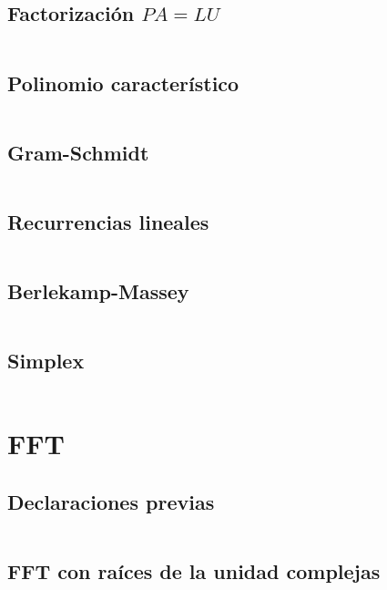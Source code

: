\documentclass[11pt]{article}
\begin{document}
		\subsection{Factorización $PA=LU$}
		\inputminted[tabsize=2,breaklines,firstline=269,lastline=285,fontsize=\small]{c++}{matrix.cpp}
		
		\subsection{Polinomio característico}
		\inputminted[tabsize=2,breaklines,firstline=287,lastline=297,fontsize=\small]{c++}{matrix.cpp}
		
		\subsection{Gram-Schmidt}
		\inputminted[tabsize=2,breaklines,firstline=299,lastline=315,fontsize=\small]{c++}{matrix.cpp}
		
		\subsection{Recurrencias lineales}
		\inputminted[tabsize=2,breaklines,firstline=7,lastline=33,fontsize=\small]{c++}{recurrence.cpp}
		
		\subsection{Berlekamp-Massey}
		\inputminted[tabsize=2,breaklines,firstline=46,lastline=81,fontsize=\small]{c++}{recurrence.cpp}
		
		\subsection{Simplex}
		\inputminted[tabsize=2,breaklines,fontsize=\small]{c++}{simplex.cpp}
		
		
	\newpage
	\section{FFT}
		\subsection{Declaraciones previas}
		\inputminted[tabsize=2,breaklines,firstline=3,lastline=11,fontsize=\small]{c++}{fft.cpp}
		
		\subsection{FFT con raíces de la unidad complejas}
		\inputminted[tabsize=2,breaklines,firstline=13,lastline=34,fontsize=\small]{c++}{fft.cpp}
		
\end{document}
